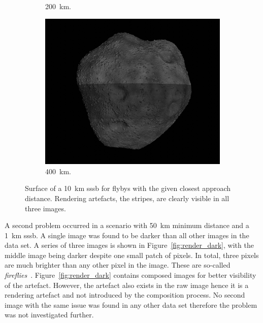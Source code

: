 \begin{figure}[htb]
\begin{subfigure}[b]{0.32\textwidth}
            \caption{\SI{200}{\kilo\meter}.}
            \label{fig:render_artefacts_200}
        \end{subfigure}
        \begin{subfigure}[b]{0.32\textwidth}
            \centering
            \includegraphics[width=\textwidth]{doc/thesis/0_figures/rendering_artefacts/400_10_SssbOnly_2017-08-15T115845-190000.jpg}
            \caption{\SI{400}{\kilo\meter}.}
            \label{fig:render_artefacts_400}
        \end{subfigure}
    \caption{Surface of a \SI{10}{\kilo\meter} \gls{sssb} for flybys with the given closest approach distance. Rendering artefacts, the stripes, are clearly visible in all three images.}
    \label{fig:render_artefacts}
\end{figure}

A second problem occurred in a scenario with \SI{50}{\kilo\meter} minimum distance and a \SI{1}{\kilo\meter} \gls{sssb}. A single image was found to be darker than all other images in the data set. A series of three images is shown in Figure~\ref{fig:render_dark}, with the middle image being darker despite one small patch of pixels. In total, three pixels are much brighter than any other pixel in the image. These are so-called \textit{fireflies}~\cite{Valenza2015BlenderCookbook}. Figure~\ref{fig:render_dark} contains composed images for better visibility of the artefact. However, the artefact also exists in the raw image hence it is a rendering artefact and not introduced by the composition process. No second image with the same issue was found in any other data set therefore the problem was not investigated further.

